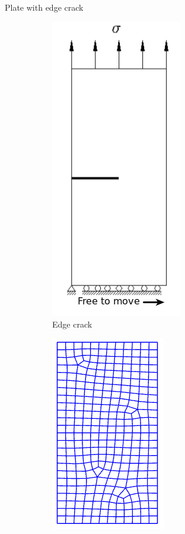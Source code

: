 \documentclass{beamer}
\begin{document}
\begin{frame}[t,fragile]{Plate with edge crack}
    \vspace{-20pt} 
\begin{figure}
    \begin{subfigure}{.2\textwidth}
         \includegraphics[scale=.20]{3.png}
         \caption{\scriptsize Edge crack}
    \end{subfigure}
    \hspace{15pt}
    \begin{subfigure}{.2\textwidth}
    \vspace{15pt}
              \includegraphics[scale=.22]{untitled1.png}

\end{subfigure}
\end{figure}
\end{frame}
\end{document}
